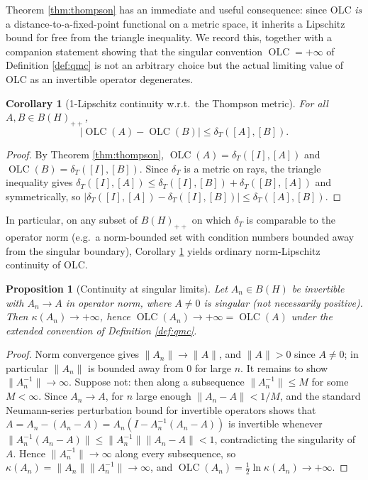 \documentclass{article}
\newtheorem{proposition}[theorem]{Proposition}
\newtheorem{corollary}[theorem]{Corollary}
\theoremstyle{remark}
\providecommand{\QLC}{\operatorname{OLC}}
\begin{document}
Theorem \ref{thm:thompson} has an immediate and useful consequence: since OLC \emph{is} a distance-to-a-fixed-point functional on a metric space, it inherits a Lipschitz bound for free from the triangle inequality. We record this, together with a companion statement showing that the singular convention $\QLC=+\infty$ of Definition \ref{def:qmc} is not an arbitrary choice but the actual limiting value of OLC as an invertible operator degenerates.

\begin{corollary}[1-Lipschitz continuity w.r.t.\ the Thompson metric]\label{cor:lipschitz}
For all $A,B\in B(H)_{++}$,
\[
|\QLC(A)-\QLC(B)| \le \delta_T([A],[B]).
\]
\end{corollary}
\begin{proof}
By Theorem \ref{thm:thompson}, $\QLC(A)=\delta_T([I],[A])$ and $\QLC(B)=\delta_T([I],[B])$. Since $\delta_T$ is a metric on rays, the triangle inequality gives $\delta_T([I],[A]) \le \delta_T([I],[B]) + \delta_T([B],[A])$ and symmetrically, so $|\delta_T([I],[A])-\delta_T([I],[B])| \le \delta_T([A],[B])$.
\end{proof}

In particular, on any subset of $B(H)_{++}$ on which $\delta_T$ is comparable to the operator norm (e.g.\ a norm-bounded set with condition numbers bounded away from the singular boundary), Corollary \ref{cor:lipschitz} yields ordinary norm-Lipschitz continuity of OLC.

\begin{proposition}[Continuity at singular limits]\label{prop:singular-cont}
Let $A_n\in B(H)$ be invertible with $A_n\to A$ in operator norm, where $A\neq0$ is singular (not necessarily positive). Then $\kappa(A_n)\to+\infty$, hence $\QLC(A_n)\to+\infty=\QLC(A)$ under the extended convention of Definition \ref{def:qmc}.
\end{proposition}
\begin{proof}
Norm convergence gives $\|A_n\|\to\|A\|$, and $\|A\|>0$ since $A\neq0$; in particular $\|A_n\|$ is bounded away from $0$ for large $n$. It remains to show $\|A_n^{-1}\|\to\infty$. Suppose not: then along a subsequence $\|A_n^{-1}\|\le M$ for some $M<\infty$. Since $A_n\to A$, for $n$ large enough $\|A_n-A\|<1/M$, and the standard Neumann-series perturbation bound for invertible operators shows that $A = A_n - (A_n-A) = A_n(I - A_n^{-1}(A_n-A))$ is invertible whenever $\|A_n^{-1}(A_n-A)\|\le\|A_n^{-1}\|\|A_n-A\|<1$, contradicting the singularity of $A$. Hence $\|A_n^{-1}\|\to\infty$ along every subsequence, so $\kappa(A_n)=\|A_n\|\|A_n^{-1}\|\to\infty$, and $\QLC(A_n)=\tfrac12\ln\kappa(A_n)\to+\infty$.
\end{proof}
\end{document}
